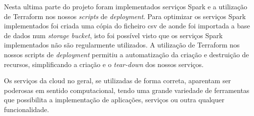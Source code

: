 \documentclass[11pt,a4paper]{article}
\begin{document}
Nesta ultima parte do projeto foram implementados serviços Spark e a utilização de Terraform nos nossos \textit{scripts} de \textit{deployment}. Para optimizar os serviços Spark implementados foi criada uma cópia do ficheiro csv de aonde foi importada a base de dados num \textit{storage bucket}, isto foi possível visto que os serviços Spark implementados não são regularmente utilizados. A utilização de Terraform nos nossos scripts de \textit{deployment} permitiu a automatização da criação e destruição de recursos, simplificando a criação e o \textit{tear-down} dos nossos serviços.

Os serviços da cloud no geral, se utilizadas de forma correta, aparentam ser poderosas em sentido computacional, tendo uma grande variedade de ferramentas que possibilita a implementação de aplicações, serviços ou outra qualquer funcionalidade.
\end{document}
